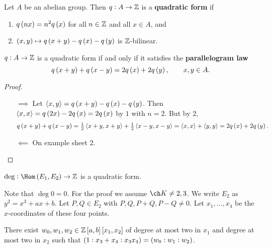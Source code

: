
\begin{definition*}
Let $ A $ be an abelian group. Then $ q : A \to \mathbb{Z} $ is a \textbf{quadratic form} if
\begin{enumerate}
\item $ q\br{nx} = n^2q\br{x} $ for all $ n \in \mathbb{Z} $ and all $ x \in A $, and
\item $ \br{x, y} \mapsto q\br{x + y} - q\br{x} - q\br{y} $ is $ \mathbb{Z} $-bilinear.
\end{enumerate}
\end{definition*}

\begin{lemma}
$ q : A \to \mathbb{Z} $ is a quadratic form if and only if it satisfies the \textbf{parallelogram law}
$$ q\br{x + y} + q\br{x - y} = 2q\br{x} + 2q\br{y}, \qquad x, y \in A. $$
\end{lemma}

\begin{proof}
\hfill
\begin{itemize}
\item[$ \implies $] Let $ \abr{x, y} = q\br{x + y} - q\br{x} - q\br{y} $. Then $ \abr{x, x} = q\br{2x} - 2q\br{x} = 2q\br{x} $ by $ 1 $ with $ n = 2 $. But by $ 2 $,
$$ q\br{x + y} + q\br{x - y} = \tfrac{1}{2}\abr{x + y, x + y} + \tfrac{1}{2}\abr{x - y, x - y} = \abr{x, x} + \abr{y, y} = 2q\br{x} + 2q\br{y}. $$
\item[$ \impliedby $] On example sheet $ 2 $.
\end{itemize}
\end{proof}

\pagebreak

\begin{theorem}
\label{thm:5.6}
$ \deg : \Hom\br{E_1, E_2} \to \ZZ $ is a quadratic form.
\end{theorem}

Note that $ \deg 0 = 0 $. For the proof we assume $ \ch K \ne 2, 3 $. We write $ E_2 $ as $ y^2 = x^3 + ax + b $. Let $ P, Q \in E_2 $ with $ P, Q, P + Q, P - Q \ne 0 $. Let $ x_1, \dots, x_4 $ be the $ x $-coordinates of these four points.

\begin{lemma}
\label{lem:5.7}
There exist $ w_0, w_1, w_2 \in \ZZ\sbr{a, b}\sbr{x_1, x_2} $ of degree at most two in $ x_1 $ and degree at most two in $ x_2 $ such that $ \br{1 : x_3 + x_4 : x_3x_4} = \br{w_0 : w_1 : w_2} $.
\end{lemma}

